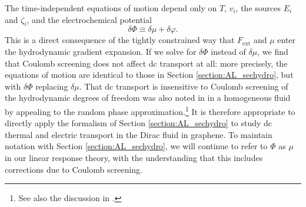 The time-independent equations of motion depend only on $ T$, $ v_i$,  the sources $ E_i$ and $ \zeta_i$, and the electrochemical potential\begin{equation}
\delta \Phi \equiv \delta \mu +  \delta \varphi .
\end{equation}
This is a direct consequence of the tightly constrained way that $F_{\mathrm{ext}}$ and $\mu$ enter the hydrodynamic gradient expansion.    If we solve for $\delta\Phi$ instead of $\delta\mu$,  we find that Coulomb screening does not affect dc transport at all:  more precisely, the equations of motion are identical to those in Section \ref{section:AL_sechydro}, but with $\delta \Phi$ replacing $\delta \mu$.   That dc transport is insensitive to Coulomb screening of the hydrodynamic degrees of freedom was also noted in \cite{muller_collective_2008} in a homogeneous fluid by appealing to the random phase approximation.\footnote{See also the discussion in \cite{pines_theory_1994, lucas_memory_2015}.}    It is therefore appropriate to directly apply the formalism of Section \ref{section:AL_sechydro} to study dc thermal and electric transport in the Dirac fluid in graphene.   To maintain notation with Section \ref{section:AL_sechydro},  we will continue to  refer to $\Phi$ as $\mu$ in our linear response theory, with the understanding that this includes corrections due to Coulomb screening.

